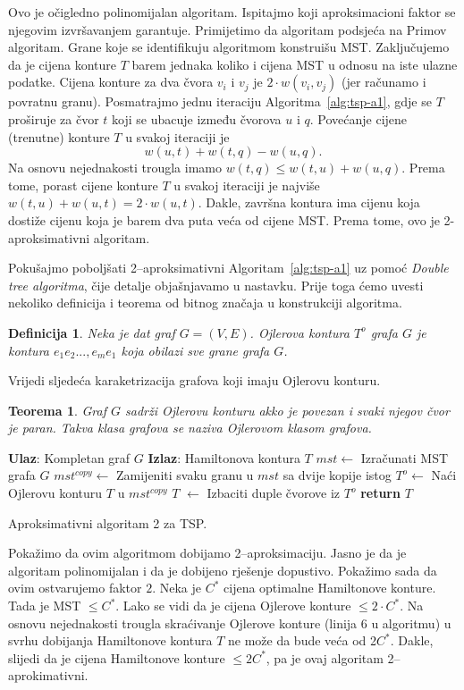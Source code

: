 \documentclass[a4paper, utf8, 11pt, colorlinks]{book}
\newtheorem{definition}{Definicija}
\newtheorem{thm}{Teorema}
\begin{document}
 Ovo je očigledno polinomijalan algoritam. Ispitajmo koji aproksimacioni faktor se 
njegovim izvršavanjem garantuje. Primijetimo da algoritam podsjeća na Primov algoritam. Grane koje se identifikuju algoritmom 
konstruišu MST. Zaključujemo da je cijena konture $T$ barem jednaka koliko i cijena MST u odnosu na iste ulazne podatke. Cijena konture za dva čvora $v_i$ i $v_j$ je $2 \cdot w({v_i,v_j})$ (jer računamo i povratnu granu). Posmatrajmo jednu iteraciju Algoritma~\ref{alg:tsp-a1}, gdje se $T$
proširuje za čvor $t$ koji se ubacuje između čvorova  $u$ i $q$. Povećanje cijene (trenutne) konture $T$ u svakoj iteraciji je $$w({u,t}) + w({t,q})-w({u,q}).$$
Na osnovu nejednakosti trougla imamo $ w({t,q}) \leq w({t,u}) + w({u,q})$. Prema tome, porast cijene konture $T$ u svakoj iteraciji je najviše $ w({t, u}) + w({u,t}) = 2\cdot w({u,t})$. 
Dakle, završna kontura ima cijenu koja dostiže cijenu koja je barem dva puta veća od cijene MST. Prema tome, ovo je 2-aproksimativni algoritam. 

 \noindent Pokušajmo poboljšati 2--aproksimativni Algoritam~\ref{alg:tsp-a1} uz pomoć \emph{Double tree algoritma}, čije detalje objašnjavamo u nastavku. Prije toga ćemo uvesti nekoliko definicija i teorema od bitnog značaja u konstrukciji algoritma. 
 \begin{definition}
 	  Neka je dat graf $G=(V,E)$. Ojlerova kontura $T^o$ grafa $G$ je kontura $e_1e_2...,e_me_1$ koja obilazi sve grane grafa $G$. 
 \end{definition}
Vrijedi sljedeća karaketrizacija grafova koji imaju Ojlerovu konturu. 
\begin{thm}
	 Graf $G$ sadrži Ojlerovu konturu akko je povezan i svaki njegov čvor je paran. Takva klasa grafova se naziva Ojlerovom klasom grafova.
\end{thm}

\begin{algorithm}[H] 
	\begin{algorithmic}[1]
		\STATE \textbf{Ulaz}: Kompletan graf $G$
		\STATE \textbf{Izlaz}: Hamiltonova kontura $T$   
		\STATE $mst \gets$  Izračunati MST grafa $G$
		\STATE $mst^{copy} \gets$ Zamijeniti svaku granu u $mst$ sa dvije kopije istog
		\STATE $T^o \gets$ Naći Ojlerovu konturu $T$ u $mst^{copy}$
		\STATE   $T$ $\gets$ Izbaciti duple čvorove iz $T^o$   
		\STATE \textbf{return} $T$ 
	\end{algorithmic}
   	\caption{Aproksimativni algoritam 2 za TSP.}
   	\label{alg:tsp-a2}
\end{algorithm}
  Pokažimo da ovim algoritmom dobijamo 2--aproksimaciju. Jasno je da je algoritam polinomijalan i da je dobijeno rješenje dopustivo. Pokažimo sada da ovim ostvarujemo faktor $2$.  
  Neka je $C^*$ cijena optimalne Hamiltonove konture. Tada je MST $\leq C^*$. 
  Lako se vidi da je cijena Ojlerove konture  $\leq 2 \cdot C^*$. Na osnovu nejednakosti trougla skraćivanje Ojlerove konture (linija 6 u algoritmu) u svrhu dobijanja Hamiltonove kontura $T$ ne može da bude veća od 2$C^*$. Dakle, slijedi da je cijena Hamiltonove konture $\leq 2 C^*$, pa je ovaj algoritam 2--aprokimativni.
  
\end{document}
